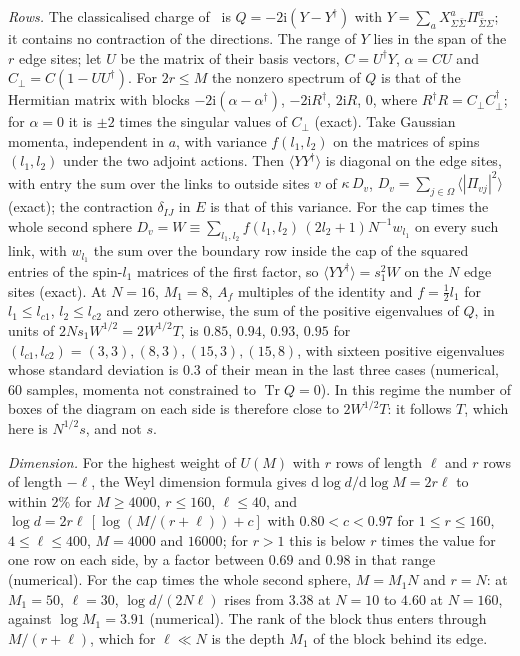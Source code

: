 \emph{Rows.} The classicalised charge of~\cite{FlissFrenkelHartnollSoni2025} is \(Q=-2\mathrm i(Y-Y^\dagger)\) with \(Y=\sum_aX^a_{\Sigma\bar\Sigma}\Pi^a_{\bar\Sigma\Sigma}\); it contains no contraction of the directions. The range of \(Y\) lies in the span of the \(r\) edge sites; let \(U\) be the matrix of their basis vectors, \(C=U^\dagger Y\), \(\alpha=CU\) and \(C_\perp=C(1-UU^\dagger)\). For \(2r\le M\) the nonzero spectrum of \(Q\) is that of the Hermitian matrix with blocks \(-2\mathrm i(\alpha-\alpha^\dagger)\), \(-2\mathrm iR^\dagger\), \(2\mathrm iR\), \(0\), where \(R^\dagger R=C_\perp C_\perp^\dagger\); for \(\alpha=0\) it is \(\pm2\) times the singular values of \(C_\perp\) (exact). Take Gaussian momenta, independent in \(a\), with variance \(f(l_1,l_2)\) on the matrices of spins \((l_1,l_2)\) under the two adjoint actions. Then \(\langle YY^\dagger\rangle\) is diagonal on the edge sites, with entry the sum over the links to outside sites \(v\) of \(\kappa\,D_v\), \(D_v=\sum_{j\in\Omega}\langle|\Pi_{vj}|^2\rangle\) (exact); the contraction \(\delta_{IJ}\) in \(E\) is that of this variance. For the cap times the whole second sphere \(D_v=W\equiv\sum_{l_1,l_2}f(l_1,l_2)\,(2l_2+1)N^{-1}w_{l_1}\) on every such link, with \(w_{l_1}\) the sum over the boundary row inside the cap of the squared entries of the spin-\(l_1\) matrices of the first factor, so \(\langle YY^\dagger\rangle=s_1^2W\) on the \(N\) edge sites (exact). At \(N=16\), \(M_1=8\), \(A_f\) multiples of the identity and \(f=\tfrac12l_1\) for \(l_1\le l_{c1}\), \(l_2\le l_{c2}\) and zero otherwise, the sum of the positive eigenvalues of \(Q\), in units of \(2Ns_1W^{1/2}=2W^{1/2}T\), is \(0.85\), \(0.94\), \(0.93\), \(0.95\) for \((l_{c1},l_{c2})=(3,3),(8,3),(15,3),(15,8)\), with sixteen positive eigenvalues whose standard deviation is \(0.3\) of their mean in the last three cases (numerical, \(60\) samples, momenta not constrained to \(\operatorname{Tr}Q=0\)). In this regime the number of boxes of the diagram on each side is therefore close to \(2W^{1/2}T\): it follows \(T\), which here is \(N^{1/2}s\), and not \(s\).

\emph{Dimension.} For the highest weight of \(U(M)\) with \(r\) rows of length \(\ell\) and \(r\) rows of length \(-\ell\), the Weyl dimension formula gives \(\mathrm d\log d/\mathrm d\log M=2r\ell\) to within \(2\%\) for \(M\ge4000\), \(r\le160\), \(\ell\le40\), and \(\log d=2r\ell\,[\log(M/(r+\ell))+c]\) with \(0.80<c<0.97\) for \(1\le r\le160\), \(4\le\ell\le400\), \(M=4000\) and \(16000\); for \(r>1\) this is below \(r\) times the value for one row on each side, by a factor between \(0.69\) and \(0.98\) in that range (numerical). For the cap times the whole second sphere, \(M=M_1N\) and \(r=N\): at \(M_1=50\), \(\ell=30\), \(\log d/(2N\ell)\) rises from \(3.38\) at \(N=10\) to \(4.60\) at \(N=160\), against \(\log M_1=3.91\) (numerical). The rank of the block thus enters through \(M/(r+\ell)\), which for \(\ell\ll N\) is the depth \(M_1\) of the block behind its edge.

